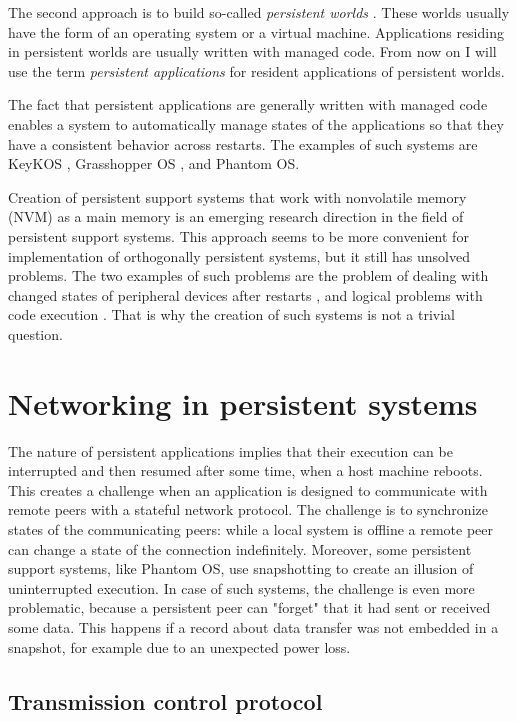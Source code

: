The second approach is to build so-called \textit{persistent worlds} 
\cite{atkinson1995orthogonally}. These worlds usually have the form of an
operating system or a virtual machine. Applications residing in persistent
worlds are usually written with managed code. From now on I will use the term
\textit{persistent applications} for resident applications of persistent
worlds.

The fact that persistent applications are generally written with managed code
enables a system to automatically manage states of the applications so that they
have a consistent behavior across restarts. The examples of such systems are
KeyKOS \cite{bomberger1992keykos}, Grasshopper OS \cite{dearle1994grasshopper},
and Phantom OS. 

Creation of persistent support systems that work with nonvolatile memory (NVM)
as a main memory is an emerging research direction in the field of persistent
support systems. This approach seems to be more convenient for implementation
of orthogonally persistent systems, but it still has unsolved problems. The two
examples of such problems are the problem of dealing with changed states of
peripheral devices after restarts \cite{berthou2018peripheral}, and logical
problems with code execution \cite{ransford2014nonvolatile}. That is why the
creation of such systems is not a trivial question. 

\section{Networking in persistent systems}
\label{sec:lr:networking}

The nature of persistent applications implies that their execution can be
interrupted and then resumed after some time, when a host machine reboots. This
creates a challenge when an application is designed to communicate with remote
peers with a stateful network protocol. The challenge is to synchronize
states of the communicating peers: while a local system is offline a remote peer
can change a state of the connection indefinitely. Moreover, some persistent
support systems, like Phantom OS, use snapshotting to create an illusion of
uninterrupted execution. In case of such systems, the challenge is even more
problematic, because a persistent peer can "forget" that it had sent or received
some data. This happens if a record about data transfer was not embedded in a
snapshot, for example due to an unexpected power loss.

\subsection{Transmission control protocol}

